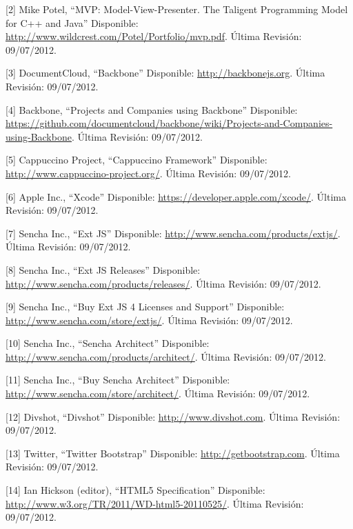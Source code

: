 \documentclass[12pt,titlepage,]{article}
\begin{document}
{[}2{]} Mike Potel, ``MVP: Model-View-Presenter. The Taligent
Programming Model for C++ and Java'' Disponible:
\href{http://www.wildcrest.com/Potel/Portfolio/mvp.pdf}{http://www.wildcrest.com/Potel/Portfolio/mvp.pdf}.
Última Revisión: 09/07/2012.

{[}3{]} DocumentCloud, ``Backbone'' Disponible:
\href{http://backbonejs.org}{http://backbonejs.org}. Última Revisión:
09/07/2012.

{[}4{]} Backbone, ``Projects and Companies using Backbone'' Disponible:
\href{https://github.com/documentcloud/backbone/wiki/Projects-and-Companies-using-Backbone}{https://github.com/documentcloud/backbone/wiki/Projects-and-Companies-using-Backbone}.
Última Revisión: 09/07/2012.

{[}5{]} Cappuccino Project, ``Cappuccino Framework'' Disponible:
\href{http://www.cappuccino-project.org/}{http://www.cappuccino-project.org/}.
Última Revisión: 09/07/2012.

{[}6{]} Apple Inc., ``Xcode'' Disponible:
\href{https://developer.apple.com/xcode/}{https://developer.apple.com/xcode/}.
Última Revisión: 09/07/2012.

{[}7{]} Sencha Inc., ``Ext JS'' Disponible:
\href{http://www.sencha.com/products/extjs/}{http://www.sencha.com/products/extjs/}.
Última Revisión: 09/07/2012.

{[}8{]} Sencha Inc., ``Ext JS Releases'' Disponible:
\href{http://www.sencha.com/products/releases/}{http://www.sencha.com/products/releases/}.
Última Revisión: 09/07/2012.

{[}9{]} Sencha Inc., ``Buy Ext JS 4 Licenses and Support'' Disponible:
\href{http://www.sencha.com/store/extjs/}{http://www.sencha.com/store/extjs/}.
Última Revisión: 09/07/2012.

{[}10{]} Sencha Inc., ``Sencha Architect'' Disponible:
\href{http://www.sencha.com/products/architect/}{http://www.sencha.com/products/architect/}.
Última Revisión: 09/07/2012.

{[}11{]} Sencha Inc., ``Buy Sencha Architect'' Disponible:
\href{http://www.sencha.com/store/architect/}{http://www.sencha.com/store/architect/}.
Última Revisión: 09/07/2012.

{[}12{]} Divshot, ``Divshot'' Disponible:
\href{http://www.divshot.com}{http://www.divshot.com}. Última Revisión:
09/07/2012.

{[}13{]} Twitter, ``Twitter Bootstrap'' Disponible:
\href{http://getbootstrap.com}{http://getbootstrap.com}. Última
Revisión: 09/07/2012.

{[}14{]} Ian Hickson (editor), ``HTML5 Specification'' Disponible:
\href{http://www.w3.org/TR/2011/WD-html5-20110525/}{http://www.w3.org/TR/2011/WD-html5-20110525/}.
Última Revisión: 09/07/2012.
\end{document}
